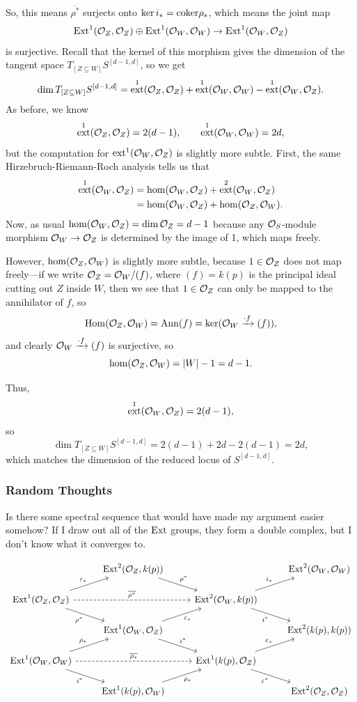 \documentclass[12pt]{article}
\DeclareMathOperator{\ext}{ext}
\begin{document}
So, this means $\overline{\rho^*}$ surjects onto $\ker i_* = \mathrm{coker} \rho_*$, which means the joint map
\[\mathrm{Ext}^1(\mathcal{O}_Z,\mathcal{O}_Z) \oplus \mathrm{Ext}^1(\mathcal{O}_W,\mathcal{O}_W) \to \mathrm{Ext}^1(\mathcal{O}_W,\mathcal{O}_Z)\]
is surjective. Recall that the kernel of this morphism gives the dimension of the tangent space $T_{[Z\subseteq W]} S^{[d-1,d]}$, so we get
\[\dim T_{[Z\subseteq W]} S^{[d-1,d]} = \ext^1(\cO_Z,\cO_Z) + \ext^1(\cO_W,\cO_W) - \ext^1(\cO_W,\cO_Z).\]
As before, we know
\[\ext^1(\cO_Z,\cO_Z) = 2(d-1), \qquad \ext^1(\cO_W,\cO_W) = 2d,\]
but the computation for $\ext^1(\cO_W,\cO_Z)$ is slightly more subtle. First, the same Hirzebruch-Riemann-Roch analysis tells us that
\begin{align*}
    \ext^1(\cO_W,\cO_Z) &= \hom(\cO_W,\cO_Z) + \ext^2(\cO_W,\cO_Z)\\
    &= \hom(\cO_W,\cO_Z) + \hom(\cO_Z,\cO_W).
\end{align*}
Now, as usual $\hom(\mathcal{O}_W,\mathcal{O}_Z)=\dim \mathcal{O}_Z=d-1$ because any $\mathcal{O}_S$-module morphism $\mathcal{O}_W\to \mathcal{O}_Z$ is determined by the image of 1, which maps freely.

However, $\hom(\mathcal{O}_Z,\mathcal{O}_W)$ is slightly more subtle, because $1\in \mathcal{O}_Z$ does not map freely---if we write $\mathcal{O}_Z=\mathcal{O}_W/(f)$, where $(f)=k(p)$ is the principal ideal cutting out $Z$ inside $W$, then we see that $1\in \mathcal{O}_Z$ can only be mapped to the annihilator of $f$, so
\[\mathrm{Hom}(\mathcal{O}_Z,\mathcal{O}_W) = \mathrm{Ann}(f) = \ker(\mathcal{O}_W \xrightarrow{\cdot f} (f)),\]
and clearly $\mathcal{O}_W \xrightarrow{\cdot f} (f)$ is surjective, so
\[\hom(\mathcal{O}_Z,\mathcal{O}_W) = |W| - 1 = d-1.\]

Thus,
\[\ext^1(\cO_W,\cO_Z) = 2(d-1),\]
so
\[\dim T_{[Z\subseteq W]} S^{[d-1,d]} = 2(d-1) + 2d - 2(d-1) = 2d,\]
which matches the dimension of the reduced locus of $S^{[d-1,d]}$.

\subsubsection*{Random Thoughts}

Is there some spectral sequence that would have made my argument easier somehow? If I draw out all of the $\mathrm{Ext}$ groups, they form a double complex, but I don't know what it converges to.

\[\begin{tikzcd}[row sep=0.5cm]
    & \Ext^2(\cO_Z,k(p)) \ar[dr,"\rho^*"] && \Ext^2(\cO_W,\cO_W)\\
    \Ext^1(\cO_Z,\cO_Z) \ar[rr,dashed,"\overline{\rho^*}"] \ar[ur,"\eps_*"] \ar[dr,"\rho^*"'] & & \Ext^2(\cO_W,k(p)) \ar[dr,"i^*"'] \ar[ur,"i_*"] &\\
    & \Ext^1(\cO_W,\cO_Z) \ar[ur,"\eps_*"'] \ar[dr,"i^*"] & & \Ext^2(k(p),k(p))\\
    \Ext^1(\cO_W,\cO_W) \ar[rr,dashed,"\overline{\rho_*}"] \ar[ur,"\rho_*"] \ar[dr,"i^*"'] & & \Ext^1(k(p),\cO_Z) \ar[ur,"\eps_*"]\ar[dr,"\eps^*"'] &\\
    & \Ext^1(k(p),\cO_W) \ar[ur,"\rho_*"'] && \Ext^2(\cO_Z,\cO_Z)
\end{tikzcd}\]



\printbibliography
\end{document}
